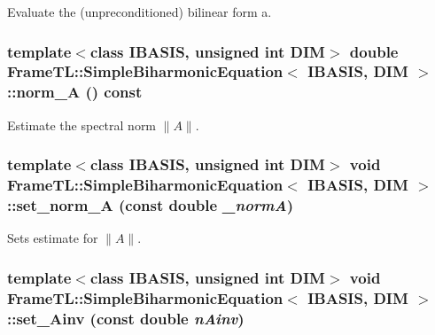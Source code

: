 Evaluate the (unpreconditioned) bilinear form a. \hypertarget{classFrameTL_1_1SimpleBiharmonicEquation_af3683e5652a266466d453da0f35f259}{
\subsubsection[norm\_\-A]{\setlength{\rightskip}{0pt plus 5cm}template$<$class IBASIS, unsigned int DIM$>$ double {\bf FrameTL::SimpleBiharmonicEquation}$<$ IBASIS, DIM $>$::norm\_\-A () const}}
\label{classFrameTL_1_1SimpleBiharmonicEquation_af3683e5652a266466d453da0f35f259}


Estimate the spectral norm $\|A\|$. \hypertarget{classFrameTL_1_1SimpleBiharmonicEquation_23b65b1275ee7a30d046306fe45cf565}{
\subsubsection[set\_\-norm\_\-A]{\setlength{\rightskip}{0pt plus 5cm}template$<$class IBASIS, unsigned int DIM$>$ void {\bf FrameTL::SimpleBiharmonicEquation}$<$ IBASIS, DIM $>$::set\_\-norm\_\-A (const double {\em \_\-normA})}}
\label{classFrameTL_1_1SimpleBiharmonicEquation_23b65b1275ee7a30d046306fe45cf565}


Sets estimate for $\|A\|$. \hypertarget{classFrameTL_1_1SimpleBiharmonicEquation_5b4d7267cb0773deeef602164671aec8}{
\subsubsection[set\_\-Ainv]{\setlength{\rightskip}{0pt plus 5cm}template$<$class IBASIS, unsigned int DIM$>$ void {\bf FrameTL::SimpleBiharmonicEquation}$<$ IBASIS, DIM $>$::set\_\-Ainv (const double {\em nAinv})}}
\label{classFrameTL_1_1SimpleBiharmonicEquation_5b4d7267cb0773deeef602164671aec8}


